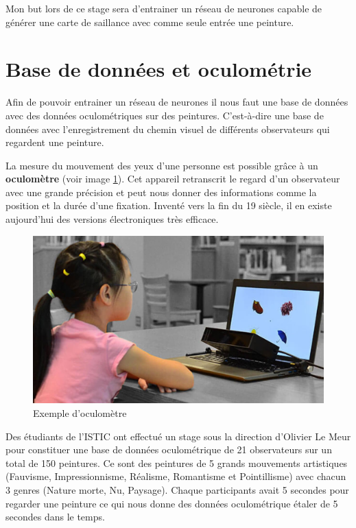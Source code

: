\par
Mon but lors de ce stage sera d'entrainer un réseau de neurones capable de générer une carte de saillance avec comme seule entrée une peinture. 

\section{Base de données et oculométrie}
\label{database}
\par
Afin de pouvoir entrainer un réseau de neurones il nous faut une base de données avec des données oculométriques sur des peintures. C'est-à-dire une base de données avec l'enregistrement du chemin visuel de différents observateurs qui regardent une peinture.

\par
La mesure du mouvement des yeux d'une personne est possible grâce à un \textbf{oculomètre} (voir image \ref{oculo}). Cet appareil retranscrit le regard d'un observateur avec une grande précision et peut nous donner des informations comme la position et la durée d'une fixation. Inventé vers la fin du 19 siècle, il en existe aujourd'hui des versions électroniques très efficace.

\begin{figure}[!ht]
    \centering
    \includegraphics[width=0.7\linewidth]{datas/oculometre.jpg}
    \caption{Exemple d'oculomètre}
    \label{oculo}
\end{figure}

Des étudiants de l'ISTIC ont effectué un stage sous la direction d'Olivier Le Meur pour constituer une base de données oculométrique de 21 observateurs sur un total de 150 peintures. Ce sont des peintures de 5 grands mouvements artistiques (Fauvisme, Impressionnisme, Réalisme, Romantisme et Pointillisme) avec chacun 3 genres (Nature morte, Nu, Paysage). Chaque participants avait 5 secondes pour regarder une peinture ce qui nous donne des données oculométrique étaler de 5 secondes dans le temps.